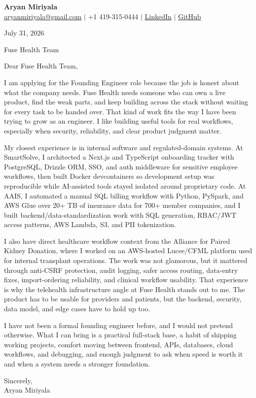 \documentclass[letterpaper,11pt]{article}
\begin{document}
{\Large\textbf{Aryan Miriyala}}\\
\href{mailto:aryanmiriyala@gmail.com}{aryanmiriyala@gmail.com} $|$ +1 419-315-0444 $|$
\href{https://www.linkedin.com/in/aryan-miriyala-7788a21b6/}{LinkedIn} $|$
\href{https://github.com/aryanmiriyala}{GitHub}

July 31, 2026

Fuse Health Team

Dear Fuse Health Team,

I am applying for the Founding Engineer role because the job is honest about what the company needs. Fuse Health needs someone who can own a live product, find the weak parts, and keep building across the stack without waiting for every task to be handed over. That kind of work fits the way I have been trying to grow as an engineer. I like building useful tools for real workflows, especially when security, reliability, and clear product judgment matter.

My closest experience is in internal software and regulated-domain systems. At SmartSolve, I architected a Next.js and TypeScript onboarding tracker with PostgreSQL, Drizzle ORM, SSO, and auth middleware for sensitive employee workflows, then built Docker devcontainers so development setup was reproducible while AI-assisted tools stayed isolated around proprietary code. At AAIS, I automated a manual SQL billing workflow with Python, PySpark, and AWS Glue over 20+ TB of insurance data for 700+ member companies, and I built backend/data-standardization work with SQL generation, RBAC/JWT access patterns, AWS Lambda, S3, and PII tokenization.

I also have direct healthcare workflow context from the Alliance for Paired Kidney Donation, where I worked on an AWS-hosted Lucee/CFML platform used for internal transplant operations. The work was not glamorous, but it mattered through anti-CSRF protection, audit logging, safer access routing, data-entry fixes, import-ordering reliability, and clinical workflow usability. That experience is why the telehealth infrastructure angle at Fuse Health stands out to me. The product has to be usable for providers and patients, but the backend, security, data model, and edge cases have to hold up too.

I have not been a formal founding engineer before, and I would not pretend otherwise. What I can bring is a practical full-stack base, a habit of shipping working projects, comfort moving between frontend, APIs, databases, cloud workflows, and debugging, and enough judgment to ask when speed is worth it and when a system needs a stronger foundation.

Sincerely,\\
Aryan Miriyala
\end{document}
